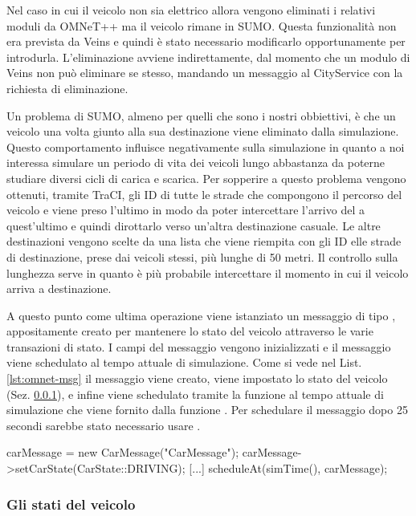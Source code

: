 Nel caso in cui il veicolo non sia elettrico allora vengono eliminati i relativi moduli da OMNeT++ ma il veicolo rimane in SUMO. Questa funzionalità non era prevista da Veins e quindi è stato necessario modificarlo opportunamente per introdurla. L'eliminazione avviene indirettamente, dal momento che un modulo di Veins non può eliminare se stesso, mandando un messaggio al CityService con la richiesta di eliminazione.

Un problema di SUMO, almeno per quelli che sono i nostri obbiettivi, è che un veicolo una volta giunto alla sua destinazione viene eliminato dalla simulazione. Questo comportamento influisce negativamente sulla simulazione in quanto a noi interessa simulare un periodo di vita dei veicoli lungo abbastanza da poterne studiare diversi cicli di carica e scarica. Per sopperire a questo problema vengono ottenuti, tramite TraCI, gli ID di tutte le strade che compongono il percorso del veicolo e viene preso l'ultimo in modo da poter intercettare l'arrivo del a quest'ultimo e quindi dirottarlo verso un'altra destinazione casuale. Le altre destinazioni vengono scelte da una lista che viene riempita con gli ID elle strade di destinazione, prese dai veicoli stessi, più lunghe di 50 metri. Il controllo sulla lunghezza serve in quanto è più probabile intercettare il momento in cui il veicolo arriva  a destinazione.

A questo punto come ultima operazione viene istanziato un messaggio di tipo , appositamente creato per mantenere lo stato del veicolo attraverso le varie transazioni di stato. I campi del messaggio vengono inizializzati e il messaggio viene schedulato al tempo attuale di simulazione. Come si vede nel List. \ref{lst:omnet-msg} il messaggio viene creato, viene impostato lo stato del veicolo (Sez. \ref{subsubsec:veh-state}), e infine viene schedulato tramite la funzione  al tempo attuale di simulazione che viene fornito dalla funzione . Per schedulare il messaggio dopo 25 secondi sarebbe stato necessario usare .

\begin{cpp}[caption={Autoschedulazione Messaggio},label={lst:omnet-msg}]
carMessage = new CarMessage("CarMessage");
carMessage->setCarState(CarState::DRIVING);
[...]
scheduleAt(simTime(), carMessage);
\end{cpp}


\subsubsection{Gli stati del veicolo}\label{subsubsec:veh-state}


